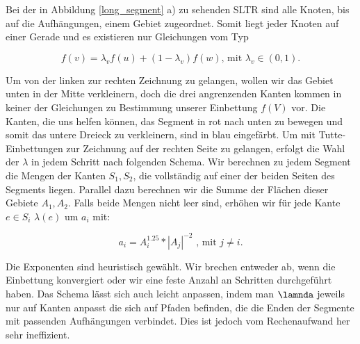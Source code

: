 \begin{example}\label{bsp_long_segment}
Bei der in Abbildung \ref{long_segment} a) zu sehenden SLTR sind alle Knoten, bis auf die Aufhängungen, einem Gebiet zugeordnet. Somit liegt jeder Knoten auf einer Gerade und es existieren nur Gleichungen vom Typ

$$ f(v) = \lambda_v f(u) + (1-\lambda_v)f(w) \text{, mit } \lambda_v \in (0,1).$$

Um von der linken zur rechten Zeichnung zu gelangen, wollen wir das Gebiet unten in der Mitte verkleinern, doch die drei angrenzenden Kanten kommen in keiner der Gleichungen zu Bestimmung unserer Einbettung $f(V)$ vor. Die Kanten, die uns helfen können, das Segment in rot nach unten zu bewegen und somit das untere Dreieck zu verkleinern, sind in blau eingefärbt. Um mit Tutte-Einbettungen zur Zeichnung auf der rechten Seite zu gelangen, erfolgt die Wahl der $\lambda$ in jedem Schritt nach folgenden Schema. Wir berechnen zu jedem Segment die Mengen der Kanten $S_1,S_2$, die vollständig auf einer der beiden Seiten des Segments liegen. Parallel dazu berechnen wir die Summe der Flächen dieser Gebiete $A_1,A_2$. Falls beide Mengen nicht leer sind, erhöhen wir für jede Kante $e \in S_i$ $\lambda(e)$ um $a_i$ mit:

$$ a_i = A_i^{1.25}*|A_j|^{-2} \text{ , mit } j \neq i.$$

Die Exponenten sind heuristisch gewählt. Wir brechen entweder ab, wenn die Einbettung konvergiert oder wir eine feste Anzahl an Schritten durchgeführt haben. Das Schema lässt sich auch leicht anpassen, indem man $\lamnda$ jeweils nur auf Kanten anpasst die sich auf Pfaden befinden, die die Enden der Segmente mit passenden Aufhängungen verbindet. Dies ist jedoch vom Rechenaufwand her sehr ineffizient.
\end{example}

